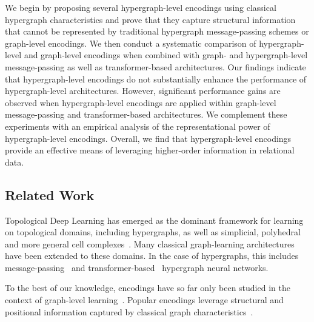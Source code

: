 We begin by proposing several hypergraph-level encodings using classical hypergraph characteristics and prove that they capture structural information that cannot be represented by traditional hypergraph message-passing schemes or graph-level encodings. We then conduct a systematic comparison of hypergraph-level and graph-level encodings when combined with graph- and hypergraph-level message-passing as well as transformer-based architectures. Our findings indicate that hypergraph-level encodings do not substantially enhance the performance of hypergraph-level architectures. However, significant performance gains are observed when hypergraph-level encodings are applied within graph-level message-passing and transformer-based architectures. 
We complement these experiments with an empirical analysis of the representational power of hypergraph-level encodings. 
Overall, we find that hypergraph-level encodings provide an effective means of leveraging higher-order information in relational data. 

\subsection{Related Work}
Topological Deep Learning has emerged as the dominant framework for learning on topological domains, including hypergraphs, as well as simplicial, polyhedral and more general cell complexes~\citep{hajij2022higher,hajij2024topox,papillon2023architectures}. Many classical graph-learning architectures have been extended to these domains. In the case of hypergraphs, this includes message-passing~\citep{huang2021unignn} and transformer-based~\citep{liu2024hypergraph} hypergraph neural networks. 

To the best of our knowledge, encodings have so far only been studied in the context of graph-level learning~\citep{dwivedi2023benchmarking}. Popular encodings leverage structural and positional information captured by classical graph characteristics~\citep{rampavsek2022recipe,kreuzer2021rethinking,cai2018simple,zhao2021stars,fesser2023effective,bouritsas2022improving}.



